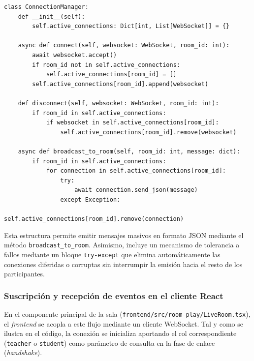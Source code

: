 \vspace{0.1cm}

\begin{lstlisting}[style=sourcecode, captionpos=b, caption={Gestor de conexiones en el \textit{backend}.}, label={lst:gestor_conexiones_backend}]
class ConnectionManager:
    def __init__(self):
        self.active_connections: Dict[int, List[WebSocket]] = {}

    async def connect(self, websocket: WebSocket, room_id: int):
        await websocket.accept()
        if room_id not in self.active_connections:
            self.active_connections[room_id] = []
        self.active_connections[room_id].append(websocket)

    def disconnect(self, websocket: WebSocket, room_id: int):
        if room_id in self.active_connections:
            if websocket in self.active_connections[room_id]:
                self.active_connections[room_id].remove(websocket)

    async def broadcast_to_room(self, room_id: int, message: dict):
        if room_id in self.active_connections:
            for connection in self.active_connections[room_id]:
                try:
                    await connection.send_json(message)
                except Exception:
                    self.active_connections[room_id].remove(connection)
\end{lstlisting}

Esta estructura permite emitir mensajes masivos en formato JSON mediante el método \texttt{broadcast\_to\_room}. Asimismo, incluye un mecanismo de tolerancia a fallos mediante un bloque \texttt{try-except} que elimina automáticamente las conexiones diferidas o corruptas sin interrumpir la emisión hacia el resto de los participantes.

\subsubsection{Suscripción y recepción de eventos en el cliente React}

En el componente principal de la sala (\texttt{frontend/src/room-play/LiveRoom.tsx}), el \textit{frontend} se acopla a este flujo mediante un cliente WebSocket. Tal y como se ilustra en el código, la conexión se inicializa aportando el rol correspondiente (\texttt{teacher} o \texttt{student}) como parámetro de consulta en la fase de enlace (\textit{handshake}).

